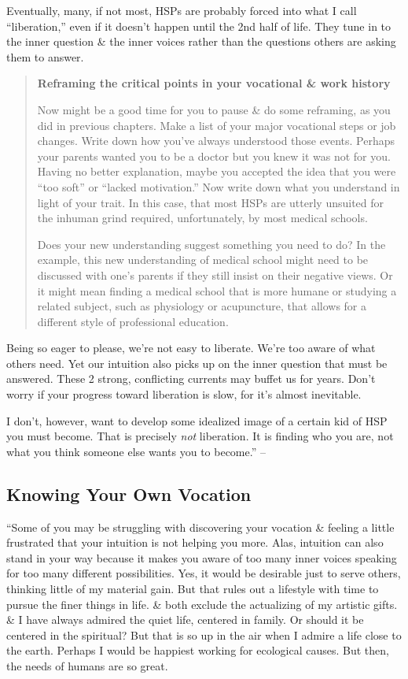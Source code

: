 \documentclass{article}
\numberwithin{equation}{section}
\begin{document}
Eventually, many, if not most, HSPs are probably forced into what I call ``liberation,'' even if it doesn't happen until the 2nd half of life. They tune in to the inner question \& the inner voices rather than the questions others are asking them to answer.
\begin{quotation}
	\textbf{Reframing the critical points in your vocational \& work history}
	
	Now might be a good time for you to pause \& do some reframing, as you did in previous chapters. Make a list of your major vocational steps or job changes. Write down how you've always understood those events. Perhaps your parents wanted you to be a doctor but you knew it was not for you. Having no better explanation, maybe you accepted the idea that you were ``too soft'' or ``lacked motivation.'' Now write down what you understand in light of your trait. In this case, that most HSPs are utterly unsuited for the inhuman grind required, unfortunately, by most medical schools.
	
	Does your new understanding suggest something you need to do? In the example, this new understanding of medical school might need to be discussed with one's parents if they still insist on their negative views. Or it might mean finding a medical school that is more humane or studying a related subject, such as physiology or acupuncture, that allows for a different style of professional education.	
\end{quotation}
Being so eager to please, we're not easy to liberate. We're too aware of what others need. Yet our intuition also picks up on the inner question that must be answered. These 2 strong, conflicting currents may buffet us for years. Don't worry if your progress toward liberation is slow, for it's almost inevitable.

I don't, however, want to develop some idealized image of a certain kid of HSP you must become. That is precisely \textit{not} liberation. It is finding who you are, not what you think someone else wants you to become.'' -- \cite[pp. 150--151]{Aron2013}

\subsection{Knowing Your Own Vocation}
``Some of you may be struggling with discovering your vocation \& feeling a little frustrated that your intuition is not helping you more. Alas, intuition can also stand in your way because it makes you aware of too many inner voices speaking for too many different possibilities. Yes, it would be desirable just to serve others, thinking little of my material gain. But that rules out a lifestyle with time to pursue the finer things in life. \& both exclude the actualizing of my artistic gifts. \& I have always admired the quiet life, centered in family. Or should it be centered in the spiritual? But that is so up in the air when I admire a life close to the earth. Perhaps I would be happiest working for ecological causes. But then, the needs of humans are so great.
\end{document}
